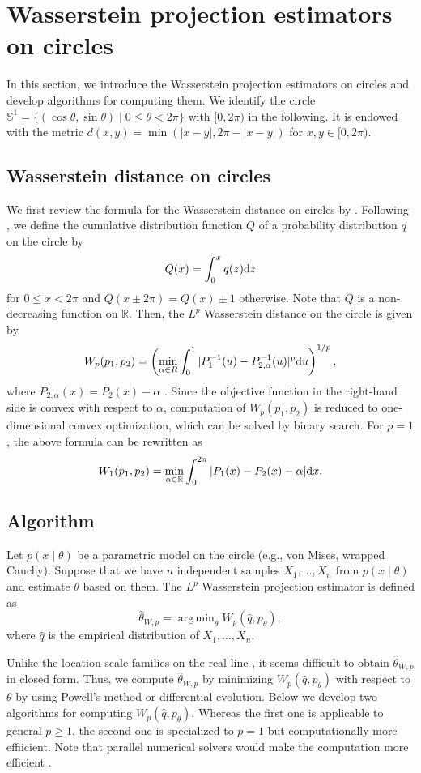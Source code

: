 \documentclass[11pt, a4paper]{article}
\DeclareMathOperator*{\argmin}{arg\,min}
\begin{document}
\section{Wasserstein projection estimators on circles}
In this section, we introduce the Wasserstein projection estimators on circles and develop algorithms for computing them.
We identify the circle $\mathbb{S}^1=\{ (\cos \theta, \sin \theta) \mid 0 \leq \theta < 2\pi \}$ with $[0, 2\pi)$ in the following.
It is endowed with the metric $d(x,y) = \min (|x-y|,2\pi-|x-y|)$ for $x,y \in [0, 2\pi)$.

\subsection{Wasserstein distance on circles}
We first review the formula for the Wasserstein distance on circles by \cite{Delon,Rabin}.
Following \cite{Rabin}, we define the cumulative distribution function $Q$ of a probability distribution $q$ on the circle by 
\[
Q(x) = \int_0^x q(z) {\rm d} z
\]
for $0 \leq x < 2 \pi$ and $Q(x \pm 2\pi) = Q(x) \pm 1$ otherwise.
Note that $Q$ is a non-decreasing function on $\mathbb{R}$.
Then, the $L^p$ Wasserstein distance on the circle is given by
\[
W_p (p_1,p_2) = \left( \min_{\alpha \in {R}} \int_0^1 |P_1^{-1} (u) - P_{2,\alpha}^{-1} (u)|^p {\rm d} u \right)^{1/p},
\]
where $P_{2,\alpha}(x)=P_2(x)-\alpha$ \cite{Rabin}.
Since the objective function in the right-hand side is convex with respect to $\alpha$, computation of $W_p (p_1,p_2)$ is reduced to one-dimensional convex optimization, which can be solved by binary search.
For $p=1$, the above formula can be rewritten as
\[
W_1 (p_1,p_2) = \min_{\alpha \in \mathbb{R}} \int_0^{2 \pi} |P_1 (x) - P_2 (x) - \alpha| {\rm d} x.
\]

\subsection{Algorithm}
Let $p(x \mid \theta)$ be a parametric model on the circle (e.g., von Mises, wrapped Cauchy).
Suppose that we have $n$ independent samples $X_1,\dots,X_n$ from $p(x \mid \theta)$ and estimate $\theta$ based on them.
The $L^p$ Wasserstein projection estimator is defined as %
\[
\hat{\theta}_{W,p} = \argmin_{\theta} W_p (\hat{q}, p_{\theta}),
\]
where $\hat{q}$ is the empirical distribution of $X_1,\dots,X_n$.

Unlike the location-scale families on the real line \citep{AM2022}, it seems difficult to obtain $\hat{\theta}_{W,p}$ in closed form. 
Thus, we compute $\hat{\theta}_{W,p}$ by minimizing $W_p (\hat{q}, p_{\theta})$ with respect to $\theta$ by using Powell's method or differential evolution.
Below we develop two algorithms for computing $W_p (\hat{q}, p_{\theta})$.
Whereas the first one is applicable to general $p \geq 1$, the second one is specialized to $p=1$ but computationally more effiicient.
Note that parallel numerical solvers would make the computation more efficient \cite{Li}.
\end{document}
